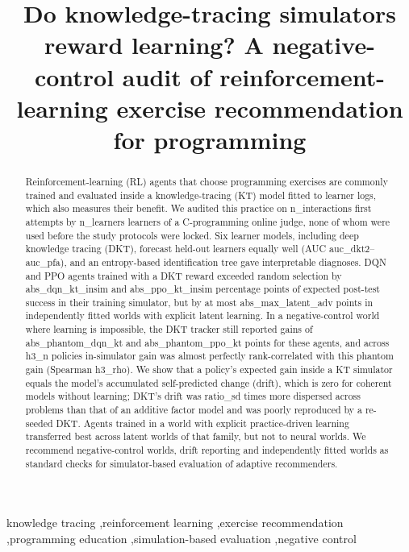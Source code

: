 \documentclass[a4paper,preprint,12pt,authoryear]{elsarticle}
\begin{document}
\begin{frontmatter}

\title{Do knowledge-tracing simulators reward learning? A negative-control audit of reinforcement-learning exercise recommendation for programming}

\begin{abstract}
Reinforcement-learning (RL) agents that choose programming exercises are commonly trained and evaluated inside a knowledge-tracing (KT) model fitted to learner logs, which also measures their benefit. We audited this practice on {{n_interactions}} first attempts by {{n_learners}} learners of a C-programming online judge, none of whom were used before the study protocols were locked. Six learner models, including deep knowledge tracing (DKT), forecast held-out learners equally well (AUC {{auc_dkt2}}--{{auc_pfa}}), and an entropy-based identification tree gave interpretable diagnoses. DQN and PPO agents trained with a DKT reward exceeded random selection by {{abs_dqn_kt_insim}} and {{abs_ppo_kt_insim}} percentage points of expected post-test success in their training simulator, but by at most {{abs_max_latent_adv}} points in independently fitted worlds with explicit latent learning. In a negative-control world where learning is impossible, the DKT tracker still reported gains of {{abs_phantom_dqn_kt}} and {{abs_phantom_ppo_kt}} points for these agents, and across {{h3_n}} policies in-simulator gain was almost perfectly rank-correlated with this phantom gain (Spearman {{h3_rho}}). We show that a policy's expected gain inside a KT simulator equals the model's accumulated self-predicted change (drift), which is zero for coherent models without learning; DKT's drift was {{ratio_sd}} times more dispersed across problems than that of an additive factor model and was poorly reproduced by a re-seeded DKT. Agents trained in a world with explicit practice-driven learning transferred best across latent worlds of that family, but not to neural worlds. We recommend negative-control worlds, drift reporting and independently fitted worlds as standard checks for simulator-based evaluation of adaptive recommenders.
\end{abstract}

\begin{keyword}
knowledge tracing \sep reinforcement learning \sep exercise recommendation \sep programming education \sep simulation-based evaluation \sep negative control
\end{keyword}

\end{frontmatter}
\end{document}
